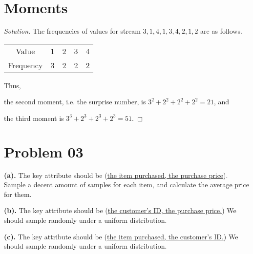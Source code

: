 \documentclass{article}
\newenvironment{solution}{\begin{proof}[\noindent\it Solution]}{\end{proof}}
\begin{document}
\vspace{1em}
\section{Moments}
\vspace{1em}
\begin{solution}
    The frequencies of values for stream $3,1,4,1,3,4,2,1,2$ are as follows.

    \begin{table}[htbp]
        \centering
        \begin{tabular}{c|cccc}
            \toprule
            Value & 1 & 2 & 3 & 4 \\
            Frequency & 3 & 2 & 2 & 2 \\
            \bottomrule
        \end{tabular}
    \end{table}

    
    Thus, 
    
    \hspace{2.6em}
    the second moment, i.e. the surprise number, is $3^2+2^2+2^2+2^2=21$, and
    
    \hspace{2.6em}
    the third moment is $3^3+2^3+2^3+2^3=51$.
\end{solution}

\vspace{1em}
\section{Problem 03}
\vspace{1em}

\textbf{(a).} The key attribute should be (\underline{the item purchased, the purchase price}). Sample a decent amount of samples for each item, and calculate the average price for them.

\hspace{-1.8em}
\textbf{(b).} The key attribute should be (\underline{the customer's ID, the purchase price.}) We should sample randomly under a uniform distribution.

\hspace{-1.8em}
\textbf{(c).} The key attribute should be (\underline{the item purchased, the customer's ID.}) We should sample randomly under a uniform distribution.
\end{document}
